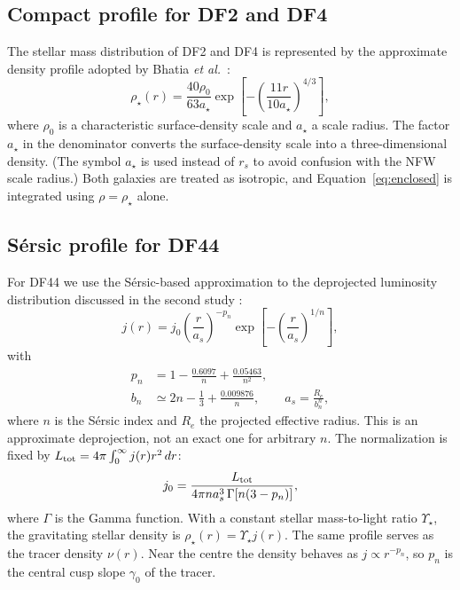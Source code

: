\documentclass[12pt,a4paper]{report}
\numberwithin{equation}{chapter}
\begin{document}
\subsection*{Compact profile for DF2 and DF4}
The stellar mass distribution of DF2 and DF4 is represented by the approximate density profile adopted by Bhatia \emph{et al.}~\cite{bhatia2023}:
\begin{equation}
 \rho_\star(r)=\frac{40\rho_0}{63a_\star}
 \exp\left[-\left(\frac{11r}{10a_\star}\right)^{4/3}\right],
 \label{eq:deficient}
\end{equation}
where $\rho_0$ is a characteristic surface-density scale and $a_\star$ a scale radius. The factor $a_\star$ in the denominator converts the surface-density scale into a three-dimensional density. (The symbol $a_\star$ is used instead of $r_s$ to avoid confusion with the NFW scale radius.) Both galaxies are treated as isotropic, and Equation~\eqref{eq:enclosed} is integrated using $\rho=\rho_\star$ alone.

\subsection*{S\'ersic profile for DF44}
For DF44 we use the S\'ersic-based approximation to the deprojected luminosity distribution discussed in the second study \cite{bhatia2024}:
\begin{equation}
 j(r)=j_0\left(\frac{r}{a_s}\right)^{-p_n}
 \exp\left[-\left(\frac{r}{a_s}\right)^{1/n}\right],
 \label{eq:sersic3d}
\end{equation}
with
\begin{align}
 p_n&=1-\frac{0.6097}{n}+\frac{0.05463}{n^2},\\
 b_n&\simeq 2n-\frac13+\frac{0.009876}{n},\qquad
 a_s=\frac{R_e}{b_n^n},
 \label{eq:sersicparams}
\end{align}
where $n$ is the S\'ersic index and $R_e$ the projected effective radius. This is an approximate deprojection, not an exact one for arbitrary $n$. The normalization is fixed by $L_{\rm tot}=4\pi\int_0^\infty j(r)r^2\,dr$:
\begin{equation}
 j_0=\frac{L_{\rm tot}}{4\pi n a_s^3\,\Gamma[n(3-p_n)]},
 \label{eq:sersicnorm}
\end{equation}
where $\Gamma$ is the Gamma function. With a constant stellar mass-to-light ratio $\Upsilon_\star$, the gravitating stellar density is $\rho_\star(r)=\Upsilon_\star j(r)$. The same profile serves as the tracer density $\nu(r)$. Near the centre the density behaves as $j\propto r^{-p_n}$, so $p_n$ is the central cusp slope $\gamma_0$ of the tracer.
\end{document}
